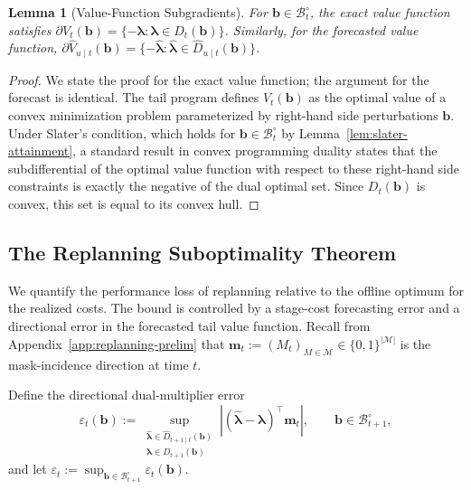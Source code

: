 \documentclass{uai2026} %
\newtheorem{lemma}{Lemma}
\newcommand{\1}{\mathbf{1}}
\renewcommand{\epsilon}{\varepsilon}
\newcommand{\mcal}{\mathcal{M}}
\newcommand{\subdiff}{\partial}
\newcommand{\bcal}{\mathcal{B}}
\begin{document}
\begin{lemma}[Value-Function Subgradients]
  \label{lem:dual-subgrad}
  For $\mathbf{b} \in \bcal_t^\circ$, the exact value function satisfies $\subdiff V_t(\mathbf{b}) = \{-\boldsymbol{\lambda} : \boldsymbol{\lambda} \in D_t(\mathbf{b})\}$.
  Similarly, for the forecasted value function, $\subdiff \hat{V}_{u\mid t}(\mathbf{b}) = \{-\hat{\boldsymbol{\lambda}} : \hat{\boldsymbol{\lambda}} \in \hat{D}_{u\mid t}(\mathbf{b})\}$.
\end{lemma}
\begin{proof}
  We state the proof for the exact value function; the argument for the forecast is identical. The tail program defines $V_t(\mathbf{b})$ as the optimal value of a convex minimization problem parameterized by right-hand side perturbations $\mathbf{b}$.
  Under Slater's condition, which holds for $\mathbf{b} \in \bcal_t^\circ$ by Lemma~\ref{lem:slater-attainment}, a standard result in convex programming duality states that the subdifferential of the optimal value function with respect to these right-hand side constraints is exactly the negative of the dual optimal set.
  Since $D_t(\mathbf{b})$ is convex, this set is equal to its convex hull.
\end{proof}

\subsection{The Replanning Suboptimality Theorem}
\label{sec:suboptimality-theorem}

We quantify the performance loss of replanning relative to the offline optimum for the realized costs.
The bound is controlled by a stage-cost forecasting error and a directional error in the forecasted tail value function.
Recall from Appendix~\ref{app:replanning-prelim} that $\mathbf{m}_t := (M_t)_{M \in \mcal} \in \{0,1\}^{|\mcal|}$ is the mask-incidence direction at time $t$.

Define the directional dual-multiplier error
\begin{equation}
  \label{eq:eps-def-app}
  \epsilon_t(\mathbf{b})
  :=
  \sup_{\substack{\hat{\boldsymbol{\lambda}}\in\hat{D}_{t+1\mid t}(\mathbf{b})\\ \boldsymbol{\lambda}\in D_{t+1}(\mathbf{b})}}
  \left| (\hat{\boldsymbol{\lambda}}-\boldsymbol{\lambda})^\top\mathbf{m}_t \right|,
  \qquad \mathbf{b}\in\bcal_{t+1}^{\circ},
\end{equation}
and let $\epsilon_t := \sup_{\mathbf{b}\in\bcal_{t+1}^{\circ}} \epsilon_t(\mathbf{b})$.
\end{document}
